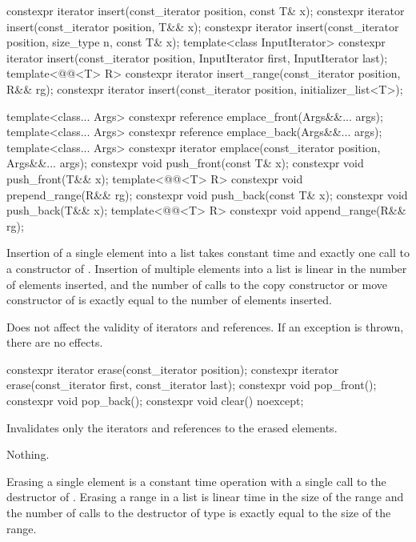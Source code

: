 %
\begin{itemdecl}
constexpr iterator insert(const_iterator position, const T& x);
constexpr iterator insert(const_iterator position, T&& x);
constexpr iterator insert(const_iterator position, size_type n, const T& x);
template<class InputIterator>
  constexpr iterator insert(const_iterator position,
                            InputIterator first, InputIterator last);
template<@@<T> R>
  constexpr iterator insert_range(const_iterator position, R&& rg);
constexpr iterator insert(const_iterator position, initializer_list<T>);

template<class... Args> constexpr reference emplace_front(Args&&... args);
template<class... Args> constexpr reference emplace_back(Args&&... args);
template<class... Args> constexpr iterator emplace(const_iterator position, Args&&... args);
constexpr void push_front(const T& x);
constexpr void push_front(T&& x);
template<@@<T> R>
  constexpr void prepend_range(R&& rg);
constexpr void push_back(const T& x);
constexpr void push_back(T&& x);
template<@@<T> R>
  constexpr void append_range(R&& rg);
\end{itemdecl}

\begin{itemdescr}
\pnum
\complexity
Insertion of a single element into a list takes constant time and
exactly one call to a constructor of
. Insertion of multiple elements into a list is linear in the
number of elements inserted, and the number of calls to the copy
constructor or move constructor of  is exactly equal
to the number of elements inserted.

\pnum
\remarks
Does not affect the validity of iterators and references.
If an exception is thrown, there are no effects.
\end{itemdescr}

%
\begin{itemdecl}
constexpr iterator erase(const_iterator position);
constexpr iterator erase(const_iterator first, const_iterator last);
constexpr void pop_front();
constexpr void pop_back();
constexpr void clear() noexcept;
\end{itemdecl}

\begin{itemdescr}
\pnum
\effects
Invalidates only the iterators and references to the erased elements.

\pnum
\throws
Nothing.

\pnum
\complexity
Erasing a single element is a constant time operation with a single call to the destructor of
.
Erasing a range in a list is linear time in the
size of the range and the number of calls to the destructor of type
is exactly equal to the size of the range.
\end{itemdescr}


